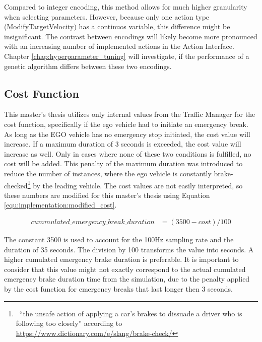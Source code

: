 Compared to integer encoding, this method allows for much higher granularity when selecting parameters. However, because only one action type (ModifyTargetVelocity) has a continuos variable, this difference might be insignificant. The contrast between encodings will likely become more pronounced with an increasing number of implemented actions in the Action Interface. Chapter \ref{chap:hyperparameter_tuning} will investigate, if the performance of a genetic algorithm differs between these two encodings.

\subsection{Cost Function}
\label{sect:implementation:cost_function}
This master's thesis utilizes only internal values from the Traffic Manager for the cost function, specifically if the ego vehicle had to initiate an emergency break. As long as the EGO vehicle has no emergency stop initiated, the cost value will increase. If a maximum duration of 3 seconds is exceeded, the cost value will increase as well. Only in cases where none of these two conditions is fulfilled, no cost will be added. This penalty of the maximum duration was introduced to reduce the number of instances, where the ego vehicle is constantly brake-checked\footnote{~\enquote{the unsafe action of applying a car’s brakes to dissuade a driver who is following too closely} according to \href{https://www.dictionary.com/e/slang/brake-check/}{https://www.dictionary.com/e/slang/brake-check/}} by the leading vehicle. The cost values are not easily interpreted, so these numbers are modified for this master's thesis using Equation \ref{equ:implementation:modified_cost}.

\begin{equation} 
	\begin{split}
		cummulated\_emergency\_break\_duration & = (3500 - cost) / 100
	\end{split}
	\label{equ:implementation:modified_cost}
\end{equation}

The constant 3500 is used to account for the 100Hz sampling rate and the duration of 35 seconds. The division by 100 transforms the value into seconds. A higher cumulated emergency brake duration is preferable. It is important to consider that this value might not exactly correspond to the actual cumulated emergency brake duration time from the simulation, due to the penalty applied by the cost function for emergency breaks that last longer then 3 seconds.

